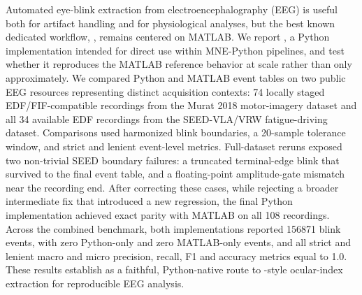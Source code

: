 Automated eye-blink extraction from electroencephalography (EEG) is useful both for artifact handling and for physiological analyses, but the best known dedicated workflow, \blinker{}, remains centered on MATLAB. We report \tool, a Python implementation intended for direct use within MNE-Python pipelines, and test whether it reproduces the MATLAB reference behavior at scale rather than only approximately. We compared Python and MATLAB event tables on two public EEG resources representing distinct acquisition contexts: 74 locally staged EDF/FIF-compatible recordings from the Murat 2018 motor-imagery dataset and all 34 available EDF recordings from the SEED-VLA/VRW fatigue-driving dataset. Comparisons used harmonized blink boundaries, a \num{20}-sample tolerance window, and strict and lenient event-level metrics. Full-dataset reruns exposed two non-trivial SEED boundary failures: a truncated terminal-edge blink that survived to the final event table, and a floating-point amplitude-gate mismatch near the recording end. After correcting these cases, while rejecting a broader intermediate fix that introduced a new regression, the final Python implementation achieved exact parity with MATLAB on all 108 recordings. Across the combined benchmark, both implementations reported \num{156871} blink events, with zero Python-only and zero MATLAB-only events, and all strict and lenient macro and micro precision, recall, F1 and accuracy metrics equal to 1.0. These results establish \tool{} as a faithful, Python-native route to \blinker-style ocular-index extraction for reproducible EEG analysis.
